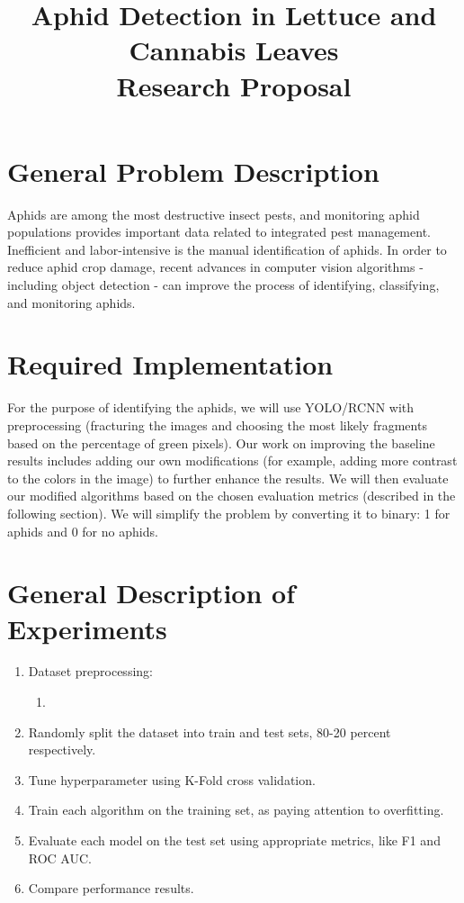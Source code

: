 \documentclass{article}
\title{Aphid Detection in Lettuce and Cannabis Leaves \\ Research Proposal}
\begin{document}
\maketitle

\section*{General Problem Description}
Aphids are among the most destructive insect pests, and monitoring aphid populations provides important data related to integrated pest management. Inefficient and labor-intensive is the manual identification of aphids. In order to reduce aphid crop damage, recent advances in computer vision algorithms - including object detection - can improve the process of identifying, classifying, and monitoring aphids.

\section*{Required Implementation}
For the purpose of identifying the aphids, we will use YOLO/RCNN with preprocessing (fracturing the images and choosing the most likely fragments based on the percentage of green pixels). Our work on improving the baseline results includes adding our own modifications (for example, adding more contrast to the colors in the image) to further enhance the results. We will then evaluate our modified algorithms based on the chosen evaluation metrics (described in the following section). We will simplify the problem by converting it to binary: 1 for aphids and 0 for no aphids.

\section*{General Description of Experiments}
\begin{enumerate}
  \item Dataset preprocessing:
  \begin{enumerate}
    \item <fill here when the data will be published> 
  \end{enumerate}
  \item Randomly split the dataset into train and test sets, 80-20 percent respectively.
  \item Tune hyperparameter using K-Fold cross validation.
  \item Train each algorithm on the training set, as paying attention to overfitting.
  \item Evaluate each model on the test set using appropriate metrics, like F1 and ROC AUC.
  \item Compare performance results.
\end{enumerate}
\end{document}
